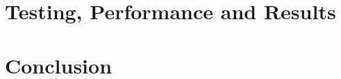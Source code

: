 \documentclass[10pt,a4paper,onesided]{report}
\begin{document}
\chapter{Testing, Performance and Results}
\prepchapter
\label{chapter:performance}


%


\chapter{Conclusion}
\prepchapter
\label{chapter:conclusion}


\newpage
\renewcommand{\thepage}{\arabic{page}} %

%


\newpage
\appendix
{}
\prepchapter


\end{document}
